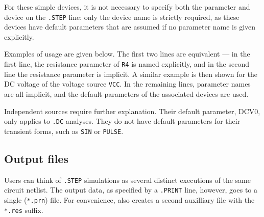 For these simple devices, it is not necessary to specify both the
parameter and device on the \texttt{.STEP} line: only the device name
is strictly required, as these devices have default parameters that
are assumed if no parameter name is given explicitly.

Examples of usage are given below.  The first two lines are equivalent
--- in the first line, the resistance parameter of \texttt{R4} is
named explicitly, and in the second line the resistance parameter is
implicit. A similar example is then shown for the DC voltage of the
voltage source \texttt{VCC}.  In the remaining lines, parameter names
are all implicit, and the default parameters of the associated devices
are used.


Independent sources require further explanation.  Their default
parameter, DCV0, only applies to \texttt{.DC} analyses.  They do not have
default parameters for their transient forms, such as \texttt{SIN}
or \texttt{PULSE}.

\subsection{Output files}
\label{step_output_files}

Users can think of \texttt{.STEP} simulations as several distinct
executions of the same circuit netlist.  The output data, as specified
by a \texttt{.PRINT} line, however, goes to a single (\texttt{*.prn})
file.  For convenience, \Xyce{} also creates a second auxilliary file
with the \texttt{*.res} suffix.

